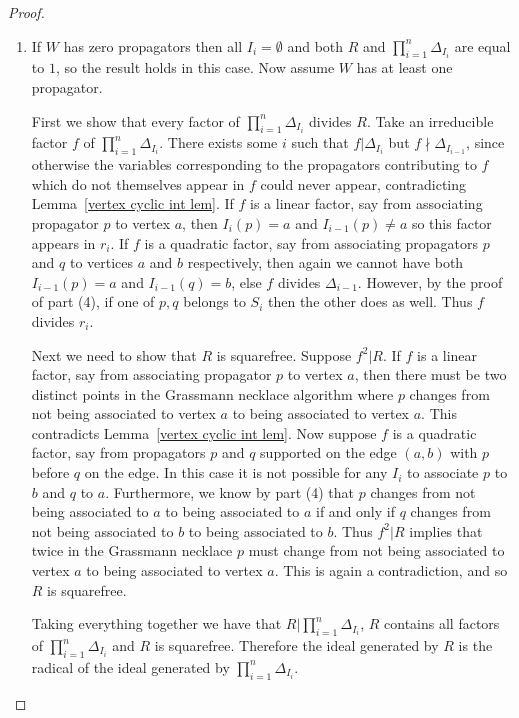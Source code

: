 \documentclass[11pt]{article}
\theoremstyle{remark}
\theoremstyle{definition}
\begin{document}
\begin{proof}
\begin{enumerate}
\item If $W$ has zero propagators then all $I_i=\emptyset$ and both $R$ and $\prod_{i=1}^n \Delta_{I_i}$ are equal to $1$, so the result holds in this case.  Now assume $W$ has at least one propagator.

First we show that every factor of $\prod_{i=1}^n \Delta_{I_i}$ divides $R$.  Take an irreducible factor $f$ of $\prod_{i=1}^n \Delta_{I_i}$. There exists some $i$ such that $f|\Delta_{I_i}$ but $f\!\!\nmid\!\! \Delta_{I_{i-1}}$, since otherwise the variables corresponding to the propagators contributing to $f$ which do not themselves appear in $f$ could never appear, contradicting Lemma~\ref{vertex cyclic int lem}.  If $f$ is a linear factor, say from associating propagator $p$ to vertex $a$, then $I_{i}(p)=a$ and $I_{i-1}(p)\neq a$ so this factor appears in $r_i$.  If $f$ is a quadratic factor, say from associating propagators $p$ and $q$ to vertices $a$ and $b$ respectively, then again we cannot have both $I_{i-1}(p) = a$ and $I_{i-1}(q) = b$, else $f$ divides $\Delta_{i-1}$. However, by the proof of part (4), if one of $p,q$ belongs to $S_i$ then the other does as well.  Thus $f$ divides $r_i$.

Next we need to show that $R$ is squarefree.  Suppose $f^2|R$.  If $f$ is a linear factor, say from associating propagator $p$ to vertex $a$, then there must be two distinct points in the Grassmann necklace algorithm where $p$ changes from not being associated to vertex $a$ to being associated to vertex $a$.  This contradicts Lemma~\ref{vertex cyclic int lem}.  Now suppose $f$ is a quadratic factor, say from propagators $p$ and $q$ supported on the edge $(a, b)$ with $p$ before $q$ on the edge.  In this case it is not possible for any $I_i$ to associate $p$ to $b$ and $q$ to $a$.  Furthermore, we know by part (4) that $p$ changes from not being associated to $a$ to being associated to $a$ if and only if $q$ changes from not being associated to $b$ to being associated to $b$.  Thus $f^2|R$ implies that twice in the Grassmann necklace $p$ must change from not being associated to vertex $a$ to being associated to vertex $a$. This is again a contradiction, and so $R$ is squarefree.

Taking everything together we have that $R|\prod_{i=1}^n \Delta_{I_i}$, $R$ contains all factors of $\prod_{i=1}^n \Delta_{I_i}$ and $R$ is squarefree.  Therefore the ideal generated by $R$ is the radical of the ideal generated by $\prod_{i=1}^n \Delta_{I_i}$.
  \end{enumerate}
\end{proof}
\end{document}
